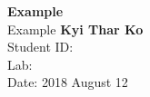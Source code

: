 \begin{titlepage}
	\begin{center}
	\vspace*{1cm}
	\Huge
	\textbf{Example }
	\\
	\vspace{3cm}
	\Large
	Example 
	\vspace{1.5cm}
	\textbf{Kyi Thar Ko}\\
	Student ID:\\
	Lab:\\
	Date: 2018 August 12\\
	\end{center}
\end{titlepage}